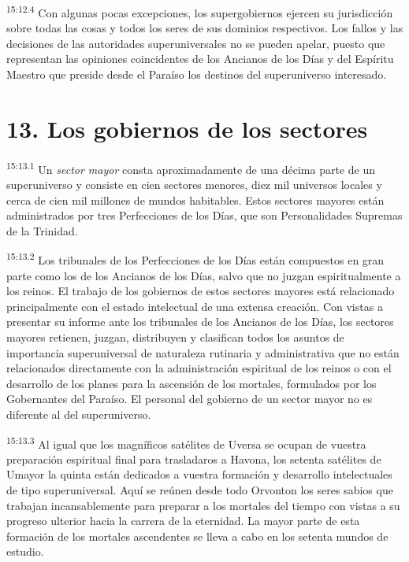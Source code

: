 \par
\textsuperscript{15:12.4} Con algunas pocas excepciones, los supergobiernos ejercen su jurisdicción sobre todas las cosas y todos los seres de sus dominios respectivos. Los fallos y las decisiones de las autoridades superuniversales no se pueden apelar, puesto que representan las opiniones coincidentes de los Ancianos de los Días y del Espíritu Maestro que preside desde el Paraíso los destinos del superuniverso interesado.

\section*{13. Los gobiernos de los sectores}
\par
\textsuperscript{15:13.1} Un \textit{sector mayor} consta aproximadamente de una décima parte de un superuniverso y consiste en cien sectores menores, diez mil universos locales y cerca de cien mil millones de mundos habitables. Estos sectores mayores están administrados por tres Perfecciones de los Días, que son Personalidades Supremas de la Trinidad.

\par
\textsuperscript{15:13.2} Los tribunales de los Perfecciones de los Días están compuestos en gran parte como los de los Ancianos de los Días, salvo que no juzgan espiritualmente a los reinos. El trabajo de los gobiernos de estos sectores mayores está relacionado principalmente con el estado intelectual de una extensa creación. Con vistas a presentar su informe ante los tribunales de los Ancianos de los Días, los sectores mayores retienen, juzgan, distribuyen y clasifican todos los asuntos de importancia superuniversal de naturaleza rutinaria y administrativa que no están relacionados directamente con la administración espiritual de los reinos o con el desarrollo de los planes para la ascensión de los mortales, formulados por los Gobernantes del Paraíso. El personal del gobierno de un sector mayor no es diferente al del superuniverso.

\par
\textsuperscript{15:13.3} Al igual que los magníficos satélites de Uversa se ocupan de vuestra preparación espiritual final para trasladaros a Havona, los setenta satélites de Umayor la quinta están dedicados a vuestra formación y desarrollo intelectuales de tipo superuniversal. Aquí se reúnen desde todo Orvonton los seres sabios que trabajan incansablemente para preparar a los mortales del tiempo con vistas a su progreso ulterior hacia la carrera de la eternidad. La mayor parte de esta formación de los mortales ascendentes se lleva a cabo en los setenta mundos de estudio.

